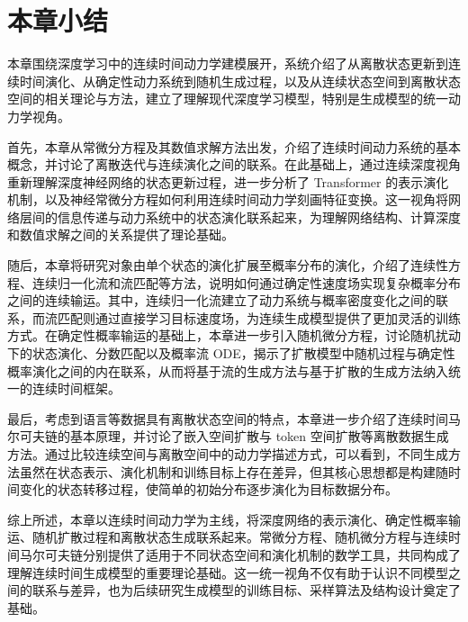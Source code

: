 \section{本章小结}

本章围绕深度学习中的连续时间动力学建模展开，系统介绍了从离散状态更新到连续时间演化、从确定性动力系统到随机生成过程，以及从连续状态空间到离散状态空间的相关理论与方法，建立了理解现代深度学习模型，特别是生成模型的统一动力学视角。

首先，本章从常微分方程及其数值求解方法出发，介绍了连续时间动力系统的基本概念，并讨论了离散迭代与连续演化之间的联系。在此基础上，通过连续深度视角重新理解深度神经网络的状态更新过程，进一步分析了 Transformer 的表示演化机制，以及神经常微分方程如何利用连续时间动力学刻画特征变换。这一视角将网络层间的信息传递与动力系统中的状态演化联系起来，为理解网络结构、计算深度和数值求解之间的关系提供了理论基础。

随后，本章将研究对象由单个状态的演化扩展至概率分布的演化，介绍了连续性方程、连续归一化流和流匹配等方法，说明如何通过确定性速度场实现复杂概率分布之间的连续输运。其中，连续归一化流建立了动力系统与概率密度变化之间的联系，而流匹配则通过直接学习目标速度场，为连续生成模型提供了更加灵活的训练方式。在确定性概率输运的基础上，本章进一步引入随机微分方程，讨论随机扰动下的状态演化、分数匹配以及概率流 ODE，揭示了扩散模型中随机过程与确定性概率演化之间的内在联系，从而将基于流的生成方法与基于扩散的生成方法纳入统一的连续时间框架。

最后，考虑到语言等数据具有离散状态空间的特点，本章进一步介绍了连续时间马尔可夫链的基本原理，并讨论了嵌入空间扩散与 token 空间扩散等离散数据生成方法。通过比较连续空间与离散空间中的动力学描述方式，可以看到，不同生成方法虽然在状态表示、演化机制和训练目标上存在差异，但其核心思想都是构建随时间变化的状态转移过程，使简单的初始分布逐步演化为目标数据分布。

综上所述，本章以连续时间动力学为主线，将深度网络的表示演化、确定性概率输运、随机扩散过程和离散状态生成联系起来。常微分方程、随机微分方程与连续时间马尔可夫链分别提供了适用于不同状态空间和演化机制的数学工具，共同构成了理解连续时间生成模型的重要理论基础。这一统一视角不仅有助于认识不同模型之间的联系与差异，也为后续研究生成模型的训练目标、采样算法及结构设计奠定了基础。
